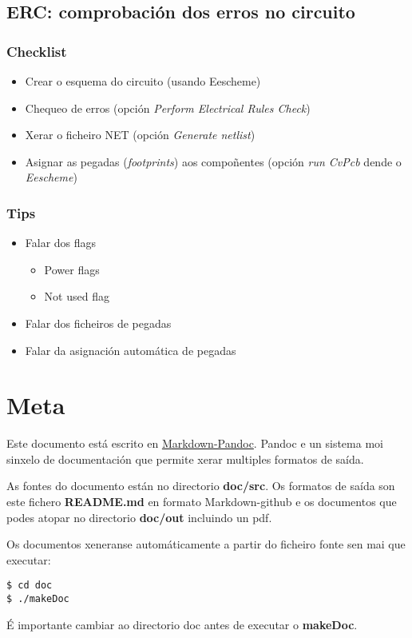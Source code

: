 \subsection{ERC: comprobación dos erros no
circuito}\label{erc-comprobaciuxf3n-dos-erros-no-circuito}

\subsubsection{Checklist}\label{checklist}

\begin{itemize}
\itemsep1pt\parskip0pt
\item
  Crear o esquema do circuito (usando Eescheme)
\item
  Chequeo de erros (opción \emph{Perform Electrical Rules Check})
\item
  Xerar o ficheiro NET (opción \emph{Generate netlist})
\item
  Asignar as pegadas (\emph{footprints}) aos compoñentes (opción
  \emph{run CvPcb} dende o \emph{Eescheme})
\end{itemize}

\subsubsection{Tips}\label{tips}

\begin{itemize}
\itemsep1pt\parskip0pt
\item
  Falar dos flags

  \begin{itemize}
  \itemsep1pt\parskip0pt
  \item
    Power flags
  \item
    Not used flag
  \end{itemize}
\item
  Falar dos ficheiros de pegadas
\item
  Falar da asignación automática de pegadas
\end{itemize}

\section{Meta}\label{meta}

Este documento está escrito en
\href{http://pandoc.org/README.html}{Markdown-Pandoc}. Pandoc e un
sistema moi sinxelo de documentación que permite xerar multiples
formatos de saída.

As fontes do documento están no directorio \textbf{doc/src}. Os formatos
de saída son este fichero \textbf{README.md} en formato Markdown-github
e os documentos que podes atopar no directorio \textbf{doc/out}
incluindo un pdf.

Os documentos xeneranse automáticamente a partir do ficheiro fonte sen
mai que executar:

\begin{verbatim}
$ cd doc
$ ./makeDoc
\end{verbatim}

É importante cambiar ao directorio doc antes de executar o
\textbf{makeDoc}.
